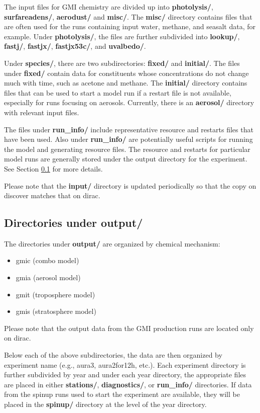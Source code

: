 The input files for GMI chemistry are divided up into \textbf{photolysis/}, \textbf{surfareadens/}, \textbf{aerodust/} and \textbf{misc/}.  The \textbf{misc/} directory contains files that are often used for the runs containing input water, methane, and seasalt data, for example. Under \textbf{photolysis/}, the files are further subdivided into \textbf{lookup/}, \textbf{fastj/}, \textbf{fastjx/}, \textbf{fastjx53c/}, and \textbf{uvalbedo/}.

Under \textbf{species/}, there are two subdirectories: \textbf{fixed/} and \textbf{initial/}.  The files under \textbf{fixed/} contain data for constituents whose concentrations do not change much with time, such as acetone and methane.  The \textbf{initial/} directory contains files that can be used to start a model run if a restart file is not available, especially for runs focusing on aerosols.  Currently, there is an \textbf{aerosol/} directory with relevant input files.

The files under \textbf{run\_info/} include representative resource and restarts files that have been used. Also under \textbf{run\_info/} are potentially useful scripts for running the model and generating resource files.  The resource and restarts for particular model runs are generally stored under the output directory for the experiment.  See Section \ref{sec:outputdirs} for more details.
%
%
\par
Please note that the \textbf{input/} directory is updated periodically so that the copy on discover matches that on dirac.
\par

\subsection{Directories under output/} \label{sec:outputdirs}

The directories under \textbf{output/} are organized by chemical mechanism:
\begin{itemize}
\item gmic (combo model)
\item gmia (aerosol model)
\item gmit (troposphere model)
\item gmis (stratosphere model)
\end{itemize}
%
\par
Please note that the output data from the GMI production runs are located only on dirac.  
\par
%
%
Below each of the above subdirectories, the data are then organized by experiment name (e.g., aura3, aura2for12h, etc.).  Each experiment directory is further subdivided by year and under each year directory, the appropriate files are placed in either \textbf{stations/}, \textbf{diagnostics/}, or \textbf{run\_info/} directories.  If data from the spinup runs used to start the experiment are available, they will be placed in the \textbf{spinup/} directory at the level of the year directory. 
